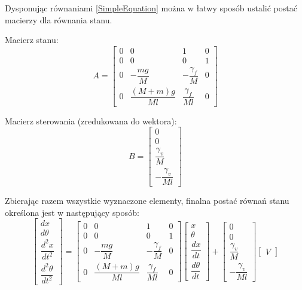 \documentclass[12pt, twoside, openany]{report}
\theoremstyle{definition}
\begin{document}
Dysponując równaniami \ref{SimpleEquation} można w łatwy sposób ustalić postać macierzy dla równania stanu.

Macierz stanu:
\begin{equation}
A = 
\begin{bmatrix}
    0 & 0                  & 1                    & 0 \\
    0 & 0                  & 0                    & 1 \\
    0 & -\dfrac{mg}{M}     & -\dfrac{\gamma_f}{M} & 0 \\[8pt]
    0 & \dfrac{(M+m)g}{Ml} & \dfrac{\gamma_f}{Ml} & 0
\end{bmatrix}
\end{equation}

Macierz sterowania (zredukowana do wektora):
\begin{equation}
B = 
\begin{bmatrix}
    0 \\
    0 \\
    \dfrac{\gamma_v}{M} \\[8pt]
    -\dfrac{\gamma_v}{Ml}
\end{bmatrix}
\end{equation}

Zbierając razem wszystkie wyznaczone elementy, finalna postać równań stanu określona jest w następujący sposób:
\begin{equation}
\begin{bmatrix}
dx \\ 
d\theta \\ 
\dfrac{d^2x}{dt^2} \\[8pt] 
\dfrac{d^2\theta}{dt^2}
\end{bmatrix}
= 
\begin{bmatrix}
    0 & 0                  & 1                    & 0 \\
    0 & 0                  & 0                    & 1 \\
    0 & -\dfrac{mg}{M}     & -\dfrac{\gamma_f}{M} & 0 \\[8pt]
    0 & \dfrac{(M+m)g}{Ml} & \dfrac{\gamma_f}{Ml} & 0
\end{bmatrix}
\begin{bmatrix}
x \\ 
\theta \\ 
\dfrac{dx}{dt} \\[8pt] 
\dfrac{d\theta}{dt}
\end{bmatrix}
+
\begin{bmatrix}
    0 \\
    0 \\
    \dfrac{\gamma_v}{M} \\[8pt]
    -\dfrac{\gamma_v}{Ml}
\end{bmatrix}
\begin{bmatrix}
V
\end{bmatrix}
\end{equation}
\end{document}
